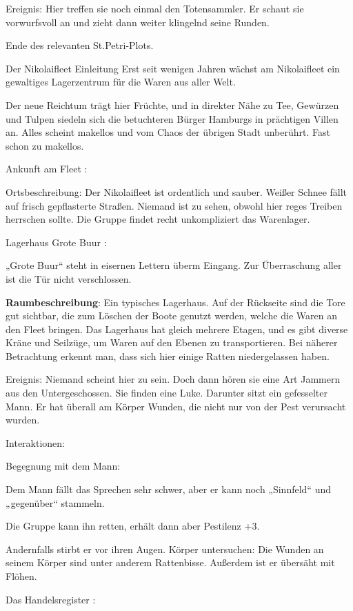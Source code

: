 Ereignis: Hier treffen sie noch einmal den Totensammler. Er schaut sie vorwurfsvoll an und zieht dann weiter klingelnd seine Runden.


Ende des relevanten St.Petri-Plots.

Der Nikolaifleet
Einleitung
Erst seit wenigen Jahren wächst am Nikolaifleet ein gewaltiges Lagerzentrum für die Waren aus aller Welt.

Der neue Reichtum trägt hier Früchte, und in direkter Nähe zu Tee, Gewürzen und Tulpen siedeln sich die betuchteren Bürger Hamburgs in prächtigen Villen an. Alles scheint makellos und vom Chaos der übrigen Stadt unberührt. Fast schon zu makellos.

Ankunft am Fleet
:

Ortsbeschreibung: Der Nikolaifleet ist ordentlich und sauber. Weißer Schnee fällt auf frisch gepflasterte Straßen. Niemand ist zu sehen, obwohl hier reges Treiben herrschen sollte. Die Gruppe findet recht unkompliziert das Warenlager.


Lagerhaus Grote Buur
:

„Grote Buur“ steht in eisernen Lettern überm Eingang. Zur Überraschung aller ist die Tür nicht verschlossen.

\textbf{Raumbeschreibung}: Ein typisches Lagerhaus. Auf der Rückseite sind die Tore gut sichtbar, die zum Löschen der Boote genutzt werden, welche die Waren an den Fleet bringen. Das Lagerhaus hat gleich mehrere Etagen, und es gibt diverse Kräne und Seilzüge, um Waren auf den Ebenen zu transportieren. Bei näherer Betrachtung erkennt man, dass sich hier einige Ratten niedergelassen haben.

Ereignis: Niemand scheint hier zu sein. Doch dann hören sie eine Art Jammern aus den Untergeschossen. Sie finden eine Luke. Darunter sitzt ein gefesselter Mann. Er hat überall am Körper Wunden, die nicht nur von der Pest verursacht wurden.

Interaktionen:

Begegnung mit dem Mann:

Dem Mann fällt das Sprechen sehr schwer, aber er kann noch „Sinnfeld“ und „gegenüber“ stammeln.

Die Gruppe kann ihn retten, erhält dann aber Pestilenz +3.

Andernfalls stirbt er vor ihren Augen.
Körper untersuchen: Die Wunden an seinem Körper sind unter anderem Rattenbisse. Außerdem ist er übersäht mit Flöhen.

Das Handelsregister
:

